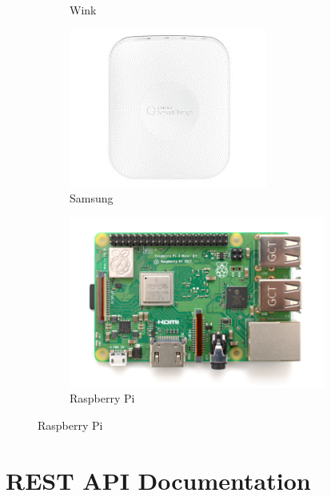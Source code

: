 \documentclass[12pt, oneside, a4paper]{book}
\begin{document}
\begin{figure}[H]
\begin{subfigure}[b]{.5\linewidth}
				\caption{Wink}
			\end{subfigure}
			\begin{subfigure}[b]{.5\linewidth}
			\includegraphics[width=\linewidth]{img/samsung_hw.png}
				\caption{Samsung}
			\end{subfigure}
			\begin{subfigure}[b]{.5\linewidth}
				\includegraphics[width=\linewidth]{img/raspberry.png}
				\caption{Raspberry Pi}
			\end{subfigure}
		\end{figure}

		\newpage\chapter{REST API Documentation}
		\label{appendix:api_doc}
		
\end{document}
